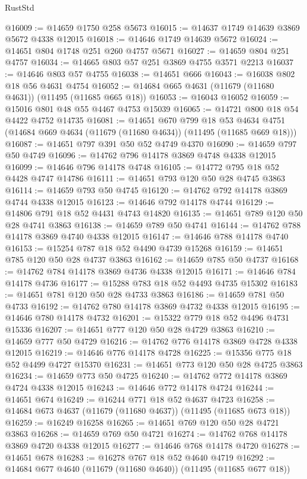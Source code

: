 \begin{lexlean}{RustStd}
\begin{coremodule}
@16009 := @14659 @1750 @258 @5673
@16015 := @14637 @1749 @14639 @3869 @5672 @4338 @12015
@16018 := @14646 @1749 @14639 @5672
@16024 := @14651 @804 @1748 @251 @260 @4757 @5671
@16027 := @14659 @804 @251 @4757
@16034 := @14665 @803 @57 @251 @3869 @4755 @3571 @2213
@16037 := @14646 @803 @57 @4755
@16038 := @14651 @666
@16043 := @16038 @802 @18 @56 @4631 @4754
@16052 := @14684 @665 @4631 (@11679 (@11680 @4631)) (@11495 (@11685 @665 @18))
@16053 := @16043 @16052
@16059 := @15016 @801 @48 @55 @4467 @4753 @15039
@16065 := @14721 @800 @18 @54 @4422 @4752 @14735
@16081 := @14651
    @670
    @799
    @18
    @53
    @4634
    @4751
    (@14684 @669 @4634 (@11679 (@11680 @4634)) (@11495 (@11685 @669 @18)))
@16087 := @14651 @797 @391 @50 @52 @4749 @4370
@16090 := @14659 @797 @50 @4749
@16096 := @14762 @796 @14178 @3869 @4748 @4338 @12015
@16099 := @14646 @796 @14178 @4748
@16105 := @14772 @795 @18 @52 @4428 @4747 @14786
@16111 := @14651 @793 @120 @50 @28 @4745 @3863
@16114 := @14659 @793 @50 @4745
@16120 := @14762 @792 @14178 @3869 @4744 @4338 @12015
@16123 := @14646 @792 @14178 @4744
@16129 := @14806 @791 @18 @52 @4431 @4743 @14820
@16135 := @14651 @789 @120 @50 @28 @4741 @3863
@16138 := @14659 @789 @50 @4741
@16144 := @14762 @788 @14178 @3869 @4740 @4338 @12015
@16147 := @14646 @788 @14178 @4740
@16153 := @15254 @787 @18 @52 @4490 @4739 @15268
@16159 := @14651 @785 @120 @50 @28 @4737 @3863
@16162 := @14659 @785 @50 @4737
@16168 := @14762 @784 @14178 @3869 @4736 @4338 @12015
@16171 := @14646 @784 @14178 @4736
@16177 := @15288 @783 @18 @52 @4493 @4735 @15302
@16183 := @14651 @781 @120 @50 @28 @4733 @3863
@16186 := @14659 @781 @50 @4733
@16192 := @14762 @780 @14178 @3869 @4732 @4338 @12015
@16195 := @14646 @780 @14178 @4732
@16201 := @15322 @779 @18 @52 @4496 @4731 @15336
@16207 := @14651 @777 @120 @50 @28 @4729 @3863
@16210 := @14659 @777 @50 @4729
@16216 := @14762 @776 @14178 @3869 @4728 @4338 @12015
@16219 := @14646 @776 @14178 @4728
@16225 := @15356 @775 @18 @52 @4499 @4727 @15370
@16231 := @14651 @773 @120 @50 @28 @4725 @3863
@16234 := @14659 @773 @50 @4725
@16240 := @14762 @772 @14178 @3869 @4724 @4338 @12015
@16243 := @14646 @772 @14178 @4724
@16244 := @14651 @674
@16249 := @16244 @771 @18 @52 @4637 @4723
@16258 := @14684 @673 @4637 (@11679 (@11680 @4637)) (@11495 (@11685 @673 @18))
@16259 := @16249 @16258
@16265 := @14651 @769 @120 @50 @28 @4721 @3863
@16268 := @14659 @769 @50 @4721
@16274 := @14762 @768 @14178 @3869 @4720 @4338 @12015
@16277 := @14646 @768 @14178 @4720
@16278 := @14651 @678
@16283 := @16278 @767 @18 @52 @4640 @4719
@16292 := @14684 @677 @4640 (@11679 (@11680 @4640)) (@11495 (@11685 @677 @18))

\end{coremodule}
\end{lexlean}
